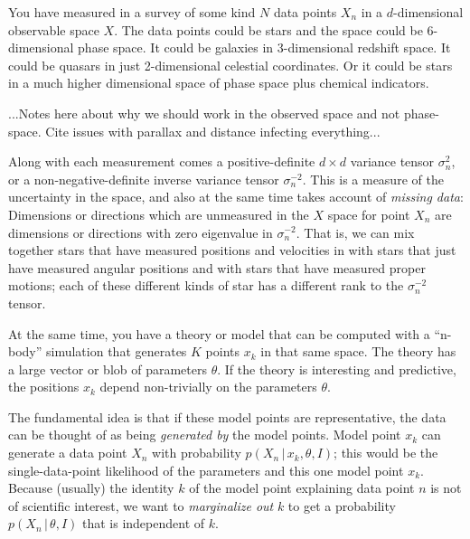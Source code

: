 \documentclass[12pt,pdftex,preprint]{aastex}
\newcommand{\given}{\,|\,}
\begin{document}
You have measured in a survey of some kind $N$ data points $X_n$ in a
$d$-dimensional observable space $X$.  The data points could be stars
and the space could be 6-dimensional phase space.  It could be
galaxies in 3-dimensional redshift space.  It could be quasars in just
2-dimensional celestial coordinates.  Or it could be stars in a much
higher dimensional space of phase space plus chemical indicators.

...Notes here about why we should work in the observed space and not
phase-space.  Cite issues with parallax and distance infecting
everything...

Along with each measurement comes a positive-definite $d\times d$
variance tensor $\sigma^2_n$, or a non-negative-definite inverse
variance tensor $\sigma^{-2}_n$.  This is a measure of the uncertainty
in the space, and also at the same time takes account of \emph{missing
  data}: Dimensions or directions which are unmeasured in the $X$
space for point $X_n$ are dimensions or directions with zero
eigenvalue in $\sigma^{-2}_n$.  That is, we can mix together stars
that have measured positions and velocities in with stars that just
have measured angular positions and with stars that have measured
proper motions; each of these different kinds of star has a different
rank to the $\sigma^{-2}_n$ tensor.

At the same time, you have a theory or model that can be computed with
a ``n-body'' simulation that generates $K$ points $x_k$ in that same
space.  The theory has a large vector or blob of parameters $\theta$.
If the theory is interesting and predictive, the positions $x_k$
depend non-trivially on the parameters $\theta$.

The fundamental idea is that if these model points are representative,
the data can be thought of as being \emph{generated by} the model
points.  Model point $x_k$ can generate a data point $X_n$ with
probability $p(X_n\given x_k,\theta,I)$; this would be the
single-data-point likelihood of the parameters and this one model
point $x_k$.  Because (usually) the identity $k$ of the model point
explaining data point $n$ is not of scientific interest, we want to
\emph{marginalize out} $k$ to get a probability $p(X_n\given\theta,I)$
that is independent of $k$.
\end{document}

